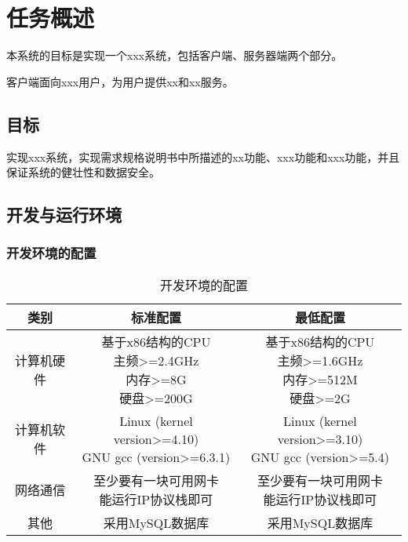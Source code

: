 \chapter{任务概述}
本系统的目标是实现一个xxx系统，包括客户端、服务器端两个部分。

客户端面向xxx用户，为用户提供xx和xx服务。

\section{目标}
实现xxx系统，实现需求规格说明书中所描述的xx功能、xxx功能和xxx功能，并且保证系统的健壮性和数据安全。

\section{开发与运行环境}

\subsection{开发环境的配置}
\begin{table}[htbp]
\centering
\caption{开发环境的配置} \label{tab:development-environment}
\begin{tabular}{|c|c|c|}
    \hline
    类别 & 标准配置 & 最低配置 \\
    \hline
    计算机硬件 & \tabincell{c}{基于x86结构的CPU\\ 主频>=2.4GHz\\ 内存>=8G\\ 硬盘>=200G} & \tabincell{c}{基于x86结构的CPU\\ 主频>=1.6GHz\\ 内存>=512M\\ 硬盘>=2G} \\
    \hline
    计算机软件 & \tabincell{c}{Linux (kernel version>=4.10)\\ GNU gcc (version>=6.3.1)} & \tabincell{c}{Linux (kernel version>=3.10)\\ GNU gcc (version>=5.4)} \\
    \hline
    网络通信 & \tabincell{c}{至少要有一块可用网卡\\ 能运行IP协议栈即可} & \tabincell{c}{至少要有一块可用网卡\\ 能运行IP协议栈即可} \\
    \hline
    其他 & 采用MySQL数据库 & 采用MySQL数据库 \\
    \hline
\end{tabular}
\end{table}


